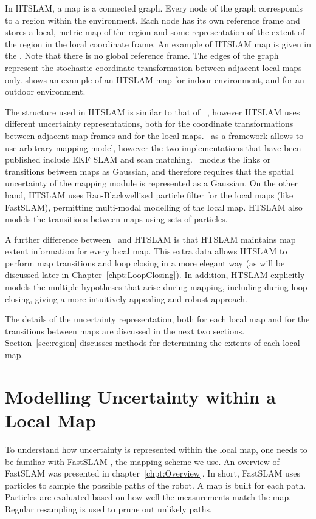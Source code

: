 In HTSLAM, a map is a connected graph. Every node of the graph
corresponds to a region within the environment. Each node has its own
reference frame and stores a local, metric map of the region and some
representation of the extent of the region in the local coordinate
frame. An example of HTSLAM map is given in the
. Note that there is no global reference
frame. The edges of the graph represent the stochastic coordinate
transformation between adjacent local maps
only.  shows an example of an
HTSLAM map for indoor environment, and
 for an outdoor environment.

The structure used in HTSLAM is similar to that of \Atlas\
\cite{bosse02atlas}, however HTSLAM uses different uncertainty
representations, both for the coordinate transformations between
adjacent map frames and for the local maps.  \Atlas\ as a framework
allows to use arbitrary mapping model, however the two implementations
that have been published include EKF SLAM and scan matching. \Atlas\
models the links or transitions between maps as Gaussian, and
therefore requires that the spatial uncertainty of the mapping module
is represented as a Gaussian.  On the other hand, HTSLAM uses
Rao-Blackwellised particle filter for the local maps (like FastSLAM),
permitting multi-modal modelling of the local map. HTSLAM also models
the transitions between maps using sets of particles.

A further difference between \Atlas\ and HTSLAM is that HTSLAM
maintains map extent information for every local map. This extra data
allows HTSLAM to perform map transitions and loop closing in a more
elegant way (as will be discussed later in
Chapter~\ref{chpt:LoopClosing}). In addition, HTSLAM explicitly
models the multiple hypotheses that arise during mapping, including
during loop closing, giving a more intuitively appealing and robust
approach.

The details of the uncertainty representation, both for each local map
and for the transitions between maps are discussed in the next two
sections.  Section~\ref{sec:region} discusses methods for
determining the extents of each local map.

\section{Modelling Uncertainty within a Local Map}
\label{sec:local_map}

To understand how uncertainty is represented within the local map, one
needs to be familiar with FastSLAM \cite{Montemerlo02d}, the mapping
scheme we use. An overview of FastSLAM was presented in
chapter~\ref{chpt:Overview}. In short, FastSLAM uses particles to
sample the possible paths of the robot. A map is built for each
path. Particles are evaluated based on how well the measurements match
the map.  Regular resampling is used to prune out unlikely paths.


